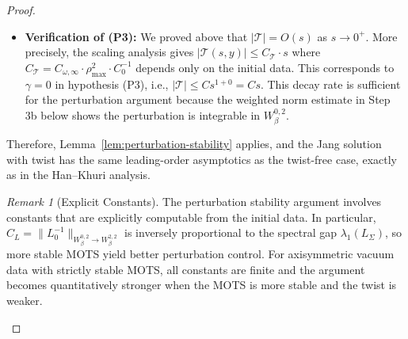 \documentclass[12pt]{article}
\theoremstyle{plain}
\theoremstyle{definition}
\theoremstyle{remark}
\newtheorem{remark}[theorem]{Remark}
\begin{document}
\begin{proof}
\begin{itemize}
    \textit{Step (vi): Coercivity estimate.} Since $L_0$ is Fredholm of index zero with trivial kernel, it is an isomorphism. The open mapping theorem gives the coercivity estimate:
    \[
    \|L_0 v\|_{W^{0,2}_\beta} \geq c \|v\|_{W^{2,2}_\beta}
    \]
    with $c = \|L_0^{-1}\|^{-1} > 0$. Combined with the a priori estimate for elliptic operators \cite[Theorem 6.2]{gilbargtrudinger2001}, this completes the verification of (P2).
    Lemma~\ref{lem:twisted-indicial} below verifies that the twist perturbation does not alter the indicial roots, hence the same Fredholm theory applies to $L_{\mathrm{axi}}$.
    
    \item \textbf{Verification of (P3):} We proved above that $|\mathcal{T}| = O(s)$ as $s \to 0^+$. More precisely, the scaling analysis gives $|\mathcal{T}(s,y)| \leq C_\mathcal{T} \cdot s$ where $C_\mathcal{T} = C_{\omega,\infty} \cdot \rho_{\max}^2 \cdot C_0^{-1}$ depends only on the initial data. This corresponds to $\gamma = 0$ in hypothesis (P3), i.e., $|\mathcal{T}| \leq Cs^{1+0} = Cs$. This decay rate is sufficient for the perturbation argument because the weighted norm estimate in Step 3b below shows the perturbation is integrable in $W^{0,2}_\beta$.
\end{itemize}

Therefore, Lemma~\ref{lem:perturbation-stability} applies, and the Jang solution with twist has the same leading-order asymptotics as the twist-free case, exactly as in the Han--Khuri analysis.

\begin{remark}[Explicit Constants]\label{rem:explicit-constants}
The perturbation stability argument involves constants that are explicitly computable from the initial data. In particular, $C_L = \|L_0^{-1}\|_{W^{0,2}_\beta \to W^{2,2}_\beta}$ is inversely proportional to the spectral gap $\lambda_1(L_\Sigma)$, so more stable MOTS yield better perturbation control. For axisymmetric vacuum data with strictly stable MOTS, all constants are finite and the argument becomes quantitatively stronger when the MOTS is more stable and the twist is weaker.
\end{remark}


\end{proof}
\end{document}
